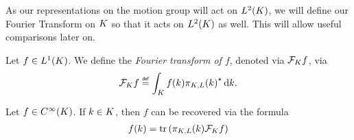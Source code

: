 As our representations on the motion group will act on $\Lebesgue{2}\CompactGroup$,
we will define our Fourier Transform on $\CompactGroup$ so that it acts on $\Lebesgue{2}\CompactGroup$ as well.
This will allow useful comparisons later on.

\begin{definition}
    Let $f \in \Lebesgue{1}\CompactGroup$.
    We define the \emph{Fourier transform of $f$}, denoted via $\Fourier[\CompactGroup] f$, via
    \begin{align*}
        \Fourier[\CompactGroup] f \defeq \int_\CompactGroup f(k) \adj{\LeftRegularRepresentation(k)} \dd k.
    \end{align*}
\end{definition}

\begin{proposition}
    Let $f \in \SmoothFunctions\CompactGroup$.
    If $k \in \CompactGroup$,
    then $f$ can be recovered via the formula
    \begin{align*}
        f(k) = \tr\left(\LeftRegularRepresentation(k) \Fourier[\CompactGroup] f \right)
    \end{align*}
\end{proposition}

